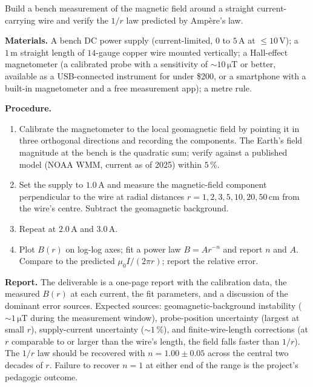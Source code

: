 \begin{project}
Build a bench measurement of the magnetic field around a straight
current-carrying wire and verify the $1/r$ law predicted by
Amp\`ere's law.

\textbf{Materials.}
A bench DC power supply (current-limited, $0$ to $5\,\si{\ampere}$ at
$\le 10\,\si{\volt}$); a $1\,\si{\meter}$ straight length of $14$-gauge
copper wire mounted vertically; a Hall-effect magnetometer (a
calibrated probe with a sensitivity of $\sim 10\,\si{\micro\tesla}$ or
better, available as a USB-connected instrument for under \$200, or a
smartphone with a built-in magnetometer and a free measurement app); a
metre rule.

\textbf{Procedure.}
\begin{enumerate}
  \item Calibrate the magnetometer to the local geomagnetic field by
    pointing it in three orthogonal directions and recording the
    components. The Earth's field magnitude at the bench is the
    quadratic sum; verify against a published model (NOAA WMM,
    current as of 2025) within $5\,\%$.
  \item Set the supply to $1.0\,\si{\ampere}$ and measure the
    magnetic-field component perpendicular to the wire at radial
    distances $r = 1, 2, 3, 5, 10, 20, 50\,\si{\centi\meter}$ from
    the wire's centre. Subtract the geomagnetic background.
  \item Repeat at $2.0\,\si{\ampere}$ and $3.0\,\si{\ampere}$.
  \item Plot $B(r)$ on log-log axes; fit a power law $B = A r^{-n}$
    and report $n$ and $A$. Compare to the predicted $\mu_{0}I/(2\pi
    r)$; report the relative error.
\end{enumerate}

\textbf{Report.} The deliverable is a one-page report with the
calibration data, the measured $B(r)$ at each current, the fit
parameters, and a discussion of the dominant error sources. Expected
sources: geomagnetic-background instability ($\sim 1\,\si{\micro
\tesla}$ during the measurement window), probe-position uncertainty
(largest at small $r$), supply-current uncertainty
($\sim 1\,\%$), and finite-wire-length corrections (at $r$ comparable
to or larger than the wire's length, the field falls faster than
$1/r$). The $1/r$ law should be recovered with $n = 1.00\pm 0.05$
across the central two decades of $r$. Failure to recover $n = 1$ at
either end of the range is the project's pedagogic outcome.
\end{project}

